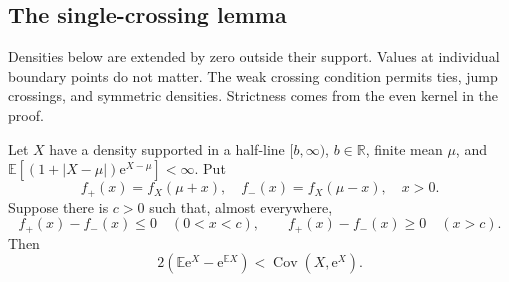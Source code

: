 \subsection{The single-crossing lemma}

Densities below are extended by zero outside their support. Values at individual boundary points do not matter. The weak crossing condition permits ties, jump crossings, and symmetric densities. Strictness comes from the even kernel in the proof.

\begin{proposition}\label{prop:exact-P2} Let \(X\) have a density supported in a half-line \([b,\infty)\), $b\in\mathbb R$, finite mean \(\mu\), and
\(\mathbb{E}[(1+|X-\mu|)\mathrm{e}^{X-\mu}]<\infty\). Put
\begin{equation}
 f_+(x)=f_X(\mu+x),\quad f_-(x)=f_X(\mu-x),\quad x>0.
\end{equation}
Suppose there is \(c>0\) such that, almost everywhere,
\begin{equation}
 f_+(x)-f_-(x)\le0\quad(0<x<c),\qquad
 f_+(x)-f_-(x)\ge0\quad(x>c).
                                                               \label{eq:exact-P2}
\end{equation}
Then
\begin{equation}
 2(\mathbb{E}\mathrm{e}^X-\mathrm{e}^{\mathbb{E}X})<\operatorname{Cov}(X,\mathrm{e}^X).             \label{eq:exact-P3}
\end{equation}

\end{proposition}
